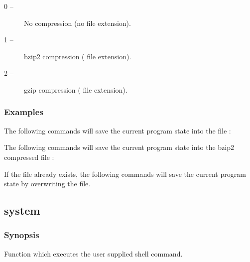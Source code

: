 \begin{description}
\item[0 --]  No compression (no file extension). 
\item[1 --]  bzip2 compression ( file extension). 
\item[2 --]  gzip compression ( file extension). 
\end{description}



\subsubsection{Examples}

The following commands will save the current program state into the file :




The following commands will save the current program state into the bzip2 compressed file :






If the file  already exists, the following commands will save the current program state by overwriting the file.






\newpage

\subsection{system}


\subsubsection{Synopsis}

Function which executes the user supplied shell command.



